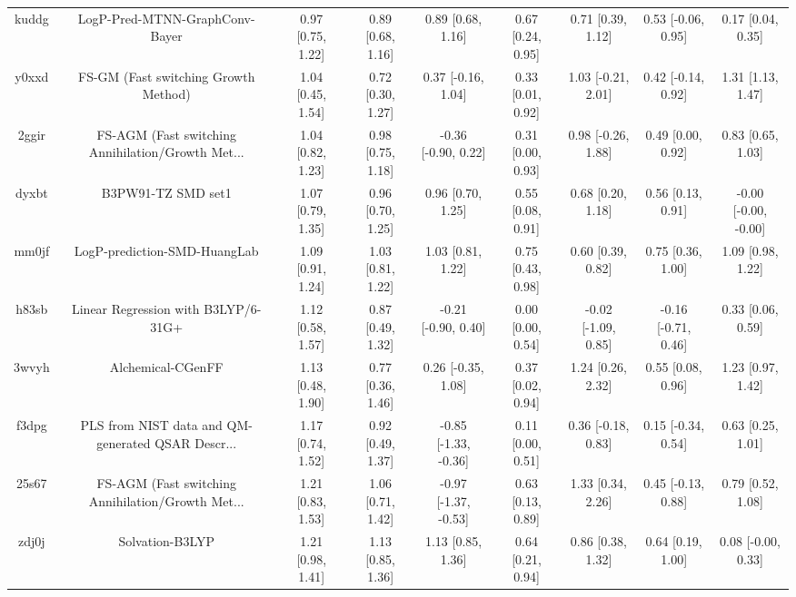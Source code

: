 \documentclass{article}
\begin{document}
\begin{center}
\begin{longtable}{|ccccccccc|}
 kuddg &                     LogP-Pred-MTNN-GraphConv-Bayer &  0.97 [0.75, 1.22] &  0.89 [0.68, 1.16] &     0.89 [0.68, 1.16] &  0.67 [0.24, 0.95] &    0.71 [0.39, 1.12] &   0.53 [-0.06, 0.95] &     0.17 [0.04, 0.35] \\
 y0xxd &               FS-GM (Fast switching Growth Method) &  1.04 [0.45, 1.54] &  0.72 [0.30, 1.27] &    0.37 [-0.16, 1.04] &  0.33 [0.01, 0.92] &   1.03 [-0.21, 2.01] &   0.42 [-0.14, 0.92] &     1.31 [1.13, 1.47] \\
 2ggir &  FS-AGM (Fast switching Annihilation/Growth Met... &  1.04 [0.82, 1.23] &  0.98 [0.75, 1.18] &   -0.36 [-0.90, 0.22] &  0.31 [0.00, 0.93] &   0.98 [-0.26, 1.88] &    0.49 [0.00, 0.92] &     0.83 [0.65, 1.03] \\
 dyxbt &                                 B3PW91-TZ SMD set1 &  1.07 [0.79, 1.35] &  0.96 [0.70, 1.25] &     0.96 [0.70, 1.25] &  0.55 [0.08, 0.91] &    0.68 [0.20, 1.18] &    0.56 [0.13, 0.91] &  -0.00 [-0.00, -0.00] \\
 mm0jf &                       LogP-prediction-SMD-HuangLab &  1.09 [0.91, 1.24] &  1.03 [0.81, 1.22] &     1.03 [0.81, 1.22] &  0.75 [0.43, 0.98] &    0.60 [0.39, 0.82] &    0.75 [0.36, 1.00] &     1.09 [0.98, 1.22] \\
 h83sb &                Linear Regression with B3LYP/6-31G+ &  1.12 [0.58, 1.57] &  0.87 [0.49, 1.32] &   -0.21 [-0.90, 0.40] &  0.00 [0.00, 0.54] &  -0.02 [-1.09, 0.85] &  -0.16 [-0.71, 0.46] &     0.33 [0.06, 0.59] \\
 3wvyh &                                  Alchemical-CGenFF &  1.13 [0.48, 1.90] &  0.77 [0.36, 1.46] &    0.26 [-0.35, 1.08] &  0.37 [0.02, 0.94] &    1.24 [0.26, 2.32] &    0.55 [0.08, 0.96] &     1.23 [0.97, 1.42] \\
 f3dpg &  PLS from NIST data and QM-generated QSAR Descr... &  1.17 [0.74, 1.52] &  0.92 [0.49, 1.37] &  -0.85 [-1.33, -0.36] &  0.11 [0.00, 0.51] &   0.36 [-0.18, 0.83] &   0.15 [-0.34, 0.54] &     0.63 [0.25, 1.01] \\
 25s67 &  FS-AGM (Fast switching Annihilation/Growth Met... &  1.21 [0.83, 1.53] &  1.06 [0.71, 1.42] &  -0.97 [-1.37, -0.53] &  0.63 [0.13, 0.89] &    1.33 [0.34, 2.26] &   0.45 [-0.13, 0.88] &     0.79 [0.52, 1.08] \\
 zdj0j &                                    Solvation-B3LYP &  1.21 [0.98, 1.41] &  1.13 [0.85, 1.36] &     1.13 [0.85, 1.36] &  0.64 [0.21, 0.94] &    0.86 [0.38, 1.32] &    0.64 [0.19, 1.00] &    0.08 [-0.00, 0.33] \\

\end{longtable}
\end{center}
\end{document}
